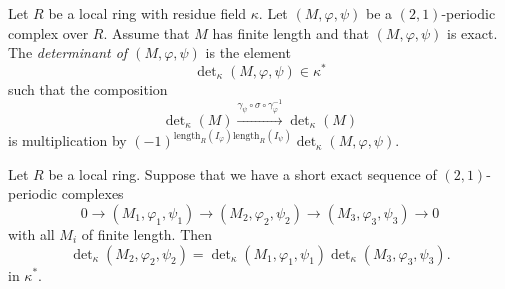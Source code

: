 \begin{definition}
\label{definition-periodic-determinant}
Let $R$ be a local ring with residue field $\kappa$.
Let $(M, \varphi, \psi)$ be a $(2, 1)$-periodic complex over $R$.
Assume that $M$ has finite length and that $(M, \varphi, \psi)$ is
exact. The {\it determinant of $(M, \varphi, \psi)$} is
the element
$$
\det\nolimits_\kappa(M, \varphi, \psi) \in \kappa^*
$$
such that the composition
$$
\det\nolimits_\kappa(M)
\xrightarrow{\gamma_\psi \circ \sigma \circ \gamma_\varphi^{-1}}
\det\nolimits_\kappa(M)
$$
is multiplication by
$(-1)^{\text{length}_R(I_\varphi)\text{length}_R(I_\psi)}
\det\nolimits_\kappa(M, \varphi, \psi)$.
\end{definition}

\begin{lemma}
\label{lemma-periodic-determinant}
Let $R$ be a local ring.
Suppose that we have a short exact sequence of
$(2, 1)$-periodic complexes
$$
0 \to (M_1, \varphi_1, \psi_1)
\to (M_2, \varphi_2, \psi_2)
\to (M_3, \varphi_3, \psi_3)
\to 0
$$
with all $M_i$ of finite length. Then
$$
\det\nolimits_\kappa(M_2, \varphi_2, \psi_2) =
\det\nolimits_\kappa(M_1, \varphi_1, \psi_1)
\det\nolimits_\kappa(M_3, \varphi_3, \psi_3).
$$
in $\kappa^*$.
\end{lemma}

